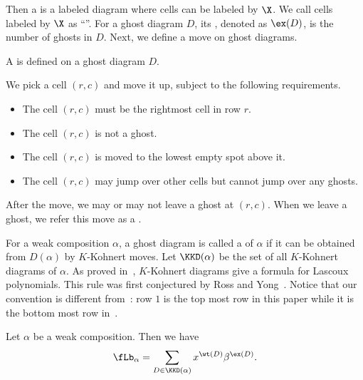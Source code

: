 Then a  is a labeled diagram 
where cells can be labeled by $\X$.
We call cells labeled by $\X$ as ``''. 
For a ghost diagram $D$, its , denoted as $\ex(D)$,
is the number of ghosts in $D$.
Next, we define a move on ghost diagrams.

\begin{defn}
A  is defined on a ghost diagram $D$. 

We pick a cell $(r,c)$ and move it up, 
subject to the following requirements.
\begin{itemize}
\item The cell $(r,c)$ must be the rightmost cell in row $r$.
\item The cell $(r,c)$ is not a ghost.
\item The cell $(r,c)$ is moved to the lowest empty spot above it.
\item The cell $(r,c)$ may jump over other cells but cannot jump over any ghosts.
\end{itemize}
After the move, 
we may or may not leave a ghost at $(r,c)$. 
When we leave a ghost, 
we refer this move as a .
\end{defn}

For a weak composition $\alpha$,
a ghost diagram is called a 
of $\alpha$ if it can be obtained from $D(\alpha)$
by $K$-Kohnert moves. 
Let $\KKD(\alpha)$ be the set of all $K$-Kohnert diagrams
of $\alpha$.
As proved in~\cite{PY}, 
$K$-Kohnert diagrams give a formula for Lascoux polynomials. 
This rule was first conjectured by Ross and Yong~\cite{RossY}.
Notice that our convention is different from~\cite{PY}:
row $1$ is the top most row in this paper while it is the 
bottom most row in~\cite{PY}. 

\begin{ourthm}[\cite{PY}]\label{thm: k.kohnert}
Let $\alpha$ be a weak composition.
Then we have
$$
\fLb_\alpha = \sum_{D \in \KKD(\alpha)}x^{\wt(D)} \beta^{\ex(D)}.
$$
\end{ourthm}

